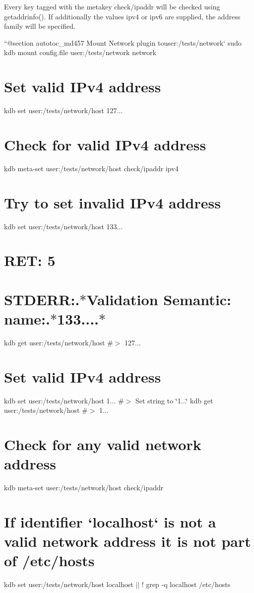 Every key tagged with the metakey {\ttfamily check/ipaddr} will be checked using {\ttfamily getaddrinfo()}. If additionally the values {\ttfamily ipv4} or {\ttfamily ipv6} are supplied, the address family will be specified.

``{\ttfamily  @section autotoc\+\_\+md457 Mount Network plugin to}user\+:/tests/network` sudo kdb mount config.\+file user\+:/tests/network network\hypertarget{autotoc_md453_autotoc_md458}{}\section{Set valid I\+Pv4 address}\label{autotoc_md453_autotoc_md458}
kdb set user\+:/tests/network/host 127... \hypertarget{autotoc_md453_autotoc_md459}{}\section{Check for valid I\+Pv4 address}\label{autotoc_md453_autotoc_md459}
kdb meta-\/set user\+:/tests/network/host check/ipaddr ipv4\hypertarget{autotoc_md453_autotoc_md460}{}\section{Try to set invalid I\+Pv4 address}\label{autotoc_md453_autotoc_md460}
kdb set user\+:/tests/network/host 133... \hypertarget{autotoc_md453_autotoc_md461}{}\section{R\+E\+T\+: 5}\label{autotoc_md453_autotoc_md461}
\hypertarget{autotoc_md453_autotoc_md462}{}\section{S\+T\+D\+E\+R\+R\+:.$\ast$\+Validation Semantic\+: name\+:.$\ast$133....$\ast$}\label{autotoc_md453_autotoc_md462}
kdb get user\+:/tests/network/host \#$>$ 127...\hypertarget{autotoc_md453_autotoc_md463}{}\section{Set valid I\+Pv4 address}\label{autotoc_md453_autotoc_md463}
kdb set user\+:/tests/network/host 1... \#$>$ Set string to \char`\"{}1...\char`\"{} kdb get user\+:/tests/network/host \#$>$ 1...\hypertarget{autotoc_md453_autotoc_md464}{}\section{Check for any valid network address}\label{autotoc_md453_autotoc_md464}
kdb meta-\/set user\+:/tests/network/host check/ipaddr \textquotesingle{}\textquotesingle{} \hypertarget{autotoc_md453_autotoc_md465}{}\section{If identifier `localhost` is not a valid network address it is not part of /etc/hosts}\label{autotoc_md453_autotoc_md465}
kdb set user\+:/tests/network/host localhost $\vert$$\vert$ ! grep -\/q localhost /etc/hosts

